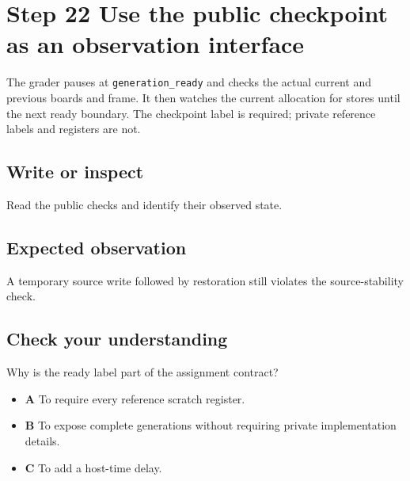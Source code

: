 \section{Step 22 Use the public checkpoint as an observation
  interface}\label{008-life-generations-s22-step-22-use-the-public-checkpoint-as-an-observation-interface}

The grader pauses at \texttt{generation\_ready} and checks the actual
current and previous boards and frame. It then watches the current
allocation for stores until the next ready boundary. The checkpoint
label is required; private reference labels and registers are not.

\subsection{Write or
  inspect}\label{008-life-generations-s22-write-or-inspect}

Read the public checks and identify their observed state.

\subsection{Expected
  observation}\label{008-life-generations-s22-expected-observation}

A temporary source write followed by restoration still violates the
source-stability check.

\subsection{Check your
  understanding}\label{008-life-generations-s22-check-your-understanding}

Why is the ready label part of the assignment contract?

\begin{itemize}
  \tightlist
  \item
        \textbf{A} To require every reference scratch register.
  \item
        \textbf{B} To expose complete generations without requiring private
        implementation details.
  \item
        \textbf{C} To add a host-time delay.
\end{itemize}

